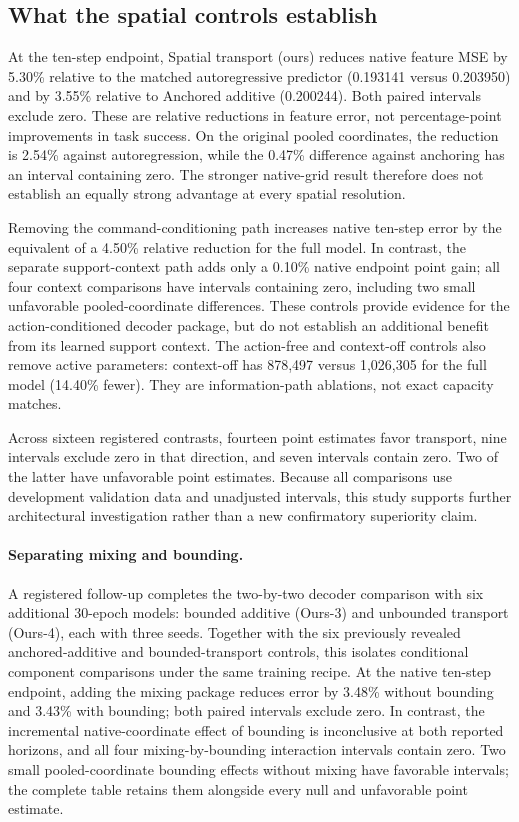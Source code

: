 \subsection{What the spatial controls establish}
At the ten-step endpoint, Spatial transport (ours) reduces native feature MSE
by 5.30\% relative to the matched autoregressive predictor
(0.193141 versus 0.203950) and by 3.55\% relative to Anchored additive
(0.200244). Both paired intervals exclude zero. These are relative reductions
in feature error, not percentage-point improvements in task success.
On the original pooled coordinates, the reduction is 2.54\% against
autoregression, while the 0.47\% difference against anchoring has an interval
containing zero. The stronger native-grid result therefore does not establish
an equally strong advantage at every spatial resolution.

Removing the command-conditioning path increases native ten-step error by
the equivalent of a 4.50\% relative reduction for the full model. In contrast,
the separate support-context path adds only a 0.10\% native endpoint point
gain; all four context comparisons have intervals containing zero, including
two small unfavorable pooled-coordinate differences. These controls provide
evidence for the action-conditioned decoder package, but do not establish an
additional benefit from its learned support context. The action-free and
context-off controls also remove active parameters: context-off has 878,497
versus 1,026,305 for the full model (14.40\% fewer). They are information-path
ablations, not exact capacity matches.

Across sixteen registered contrasts, fourteen point estimates favor transport,
nine intervals exclude zero in that direction, and seven intervals contain zero.
Two of the latter have unfavorable point estimates. Because all comparisons
use development validation data and unadjusted intervals, this study supports
further architectural investigation rather than a new confirmatory superiority
claim.

\paragraph{Separating mixing and bounding.}
A registered follow-up completes the two-by-two decoder comparison with six
additional 30-epoch models: bounded additive (Ours-3) and unbounded transport
(Ours-4), each with three seeds. Together with the six previously revealed
anchored-additive and bounded-transport controls, this isolates conditional
component comparisons under the same training recipe. At the native ten-step
endpoint, adding the mixing package reduces error by 3.48\% without bounding
and 3.43\% with bounding; both paired intervals exclude zero. In contrast,
the incremental native-coordinate effect of bounding is inconclusive at both
reported horizons, and all four mixing-by-bounding interaction intervals
contain zero. Two small pooled-coordinate bounding effects without mixing
have favorable intervals; the complete table retains them alongside every
null and unfavorable point estimate.

